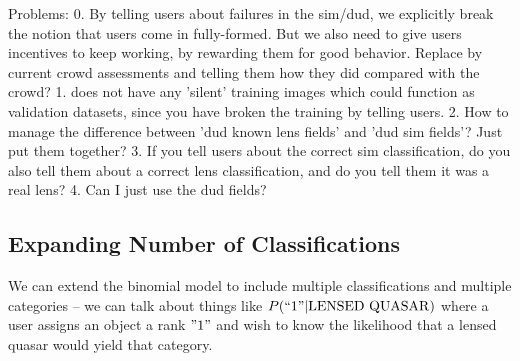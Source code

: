 \documentclass[useAMS,usenatbib,a4paper]{mn2e}
\begin{document}
Problems:
0. By telling users about failures in the sim/dud, we explicitly break the
notion that users come in fully-formed. But we also need to give users
incentives to keep working, by rewarding them for good behavior. Replace by
current crowd assessments and telling them how they did compared with the
crowd?
1. \SW does not have any 'silent' training images which could function as
validation datasets, since you have broken the training by telling users.
2. How to manage the difference between 'dud known lens fields' and 'dud sim
fields'? Just put them together?
3. If you tell users about the correct sim classification, do you also tell
them about a correct lens classification, and do you tell them it was a real
lens?
4. Can I just use the dud fields?


\subsection{Expanding Number of Classifications}


We can extend the \SW binomial model to include multiple classifications and
multiple categories -- we can talk about things like $P(``1" | \rm{LENSED\
QUASAR})$ where a user assigns an object a rank $"1"$ and wish to know the
likelihood that a lensed quasar would yield that category.
\end{document}
